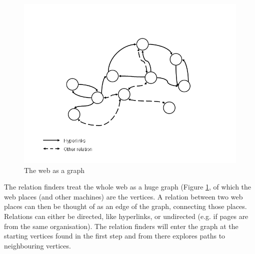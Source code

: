 \documentclass[a4paper]{danarticle}
\theoremstyle{remark}
\begin{document}
      \begin{figure}[ht]
        \centering
        \includegraphics[width=12cm]{webgraph}
        \caption{The web as a graph}
        \label{webgraph}
      \end{figure}
      The relation finders treat the whole web as a huge graph (Figure
      \ref{webgraph}, of
      which the web places (and other machines) are the vertices. A relation
      between two web places can then be thought of as an edge of the graph,
      connecting those places. Relations can either be directed, like
      hyperlinks, or undirected (e.g. if pages are from the same organisation). 
      The relation finders will enter the graph at the
      starting vertices found in the first step and from there explores paths to
      neighbouring vertices.
      
\end{document}
